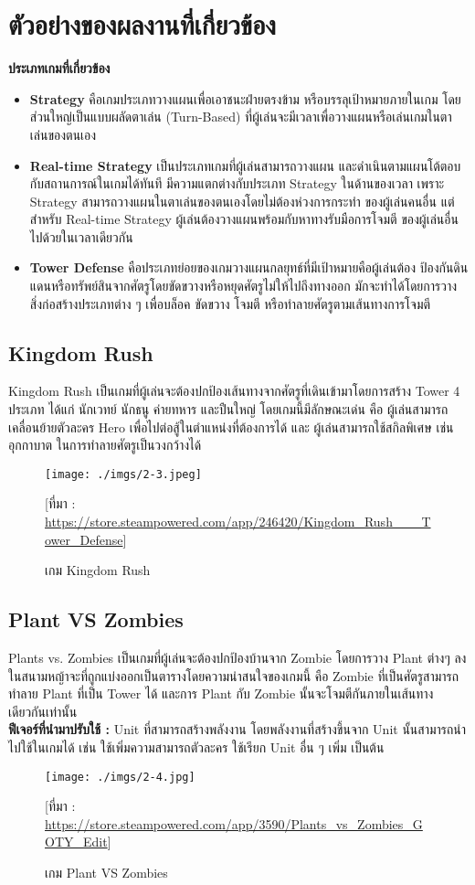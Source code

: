 \documentclass[12pt,oneside,openright,a4paper]{cpe-thai-project}
\begin{document}
\section{ตัวอย่างของผลงานที่เกี่ยวข้อง}
\textbf{ประเภทเกมที่เกี่ยวข้อง}
\begin{itemize}
  \item \textbf{Strategy} คือเกมประเภทวางแผนเพื่อเอาชนะฝ่ายตรงข้าม 
  หรือบรรลุเป้าหมายภายในเกม โดยส่วนใหญ่เป็นแบบผลัดตาเล่น (Turn-Based) 
  ที่ผู้เล่นจะมีเวลาเพื่อวางแผนหรือเล่นเกมในตาเล่นของตนเอง
  \item \textbf{Real-time Strategy} เป็นประเภทเกมที่ผู้เล่นสามารถวางแผน
  และดำเนินตามแผนโต้ตอบกับสถานการณ์ในเกมได้ทันที มีความแตกต่างกับประเภท Strategy 
  ในด้านของเวลา เพราะ Strategy สามารถวางแผนในตาเล่นของตนเองโดยไม่ต้องห่วงการกระทำ
  ของผู้เล่นคนอื่น แต่สำหรับ Real-time Strategy ผู้เล่นต้องวางแผนพร้อมกับหาทางรับมือการโจมตี
  ของผู้เล่นอื่นไปด้วยในเวลาเดียวกัน
  \item \textbf{Tower Defense} คือประเภทย่อยของเกมวางแผนกลยุทธ์ที่มีเป้าหมายคือผู้เล่นต้อง
  ป้องกันดินแดนหรือทรัพย์สินจากศัตรูโดยขัดขวางหรือหยุดศัตรูไม่ให้ไปถึงทางออก 
  มักจะทำได้โดยการวางสิ่งก่อสร้างประเภทต่าง ๆ เพื่อบล็อค ขัดขวาง โจมตี 
  หรือทำลายศัตรูตามเส้นทางการโจมตี
\end{itemize}

\subsection{Kingdom Rush}
Kingdom Rush เป็นเกมที่ผู้เล่นจะต้องปกป้องเส้นทางจากศัตรูที่เดินเข้ามาโดยการสร้าง 
Tower 4 ประเภท ได้แก่ นักเวทย์ นักธนู ค่ายทหาร และปืนใหญ่ โดยเกมนี้มีลักษณะเด่น 
คือ ผู้เล่นสามารถเคลื่อนย้ายตัวละคร Hero เพื่อไปต่อสู้ในตำแหน่งที่ต้องการได้ และ 
ผู้เล่นสามารถใช้สกิลพิเศษ เช่น อุกกาบาต ในการทำลายศัตรูเป็นวงกว้างได้
\begin{figure}[H]\centering
  \texttt{[image: ./imgs/2-3.jpeg]}
  \caption{เกม Kingdom Rush}\label{fig:2-3}
  \small [ที่มา : \url{https://store.steampowered.com/app/246420/Kingdom_Rush___Tower_Defense}]
\end{figure}

\pagebreak
\subsection{Plant VS Zombies}
Plants vs. Zombies เป็นเกมที่ผู้เล่นจะต้องปกป้องบ้านจาก Zombie 
โดยการวาง Plant ต่างๆ ลงในสนามหญ้าจะที่ถูกแบ่งออกเป็นตารางโดยความน่าสนใจของเกมนี้ 
คือ Zombie ที่เป็นศัตรูสามารถทำลาย Plant ที่เป็น Tower ได้ และการ Plant กับ Zombie 
นั้นจะโจมตีกันภายในเส้นทางเดียวกันเท่านั้น\\
\textbf{ฟีเจอร์ที่นำมาปรับใช้ : } Unit ที่สามารถสร้างพลังงาน โดยพลังงานที่สร้างขึ้นจาก 
Unit นั้นสามารถนำไปใช้ในเกมได้ เช่น ใช้เพิ่มความสามารถตัวละคร  
ใช้เรียก Unit อื่น ๆ เพิ่ม เป็นต้น
\begin{figure}[H]\centering
  \texttt{[image: ./imgs/2-4.jpg]}
  \caption{เกม Plant VS Zombies}\label{fig:2-4}
  \small [ที่มา : \url{https://store.steampowered.com/app/3590/Plants_vs_Zombies_GOTY_Edit}]
\end{figure}
\end{document}
